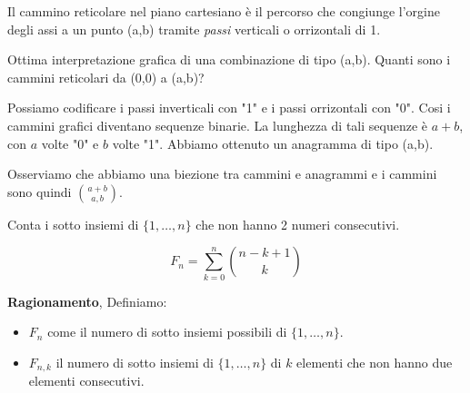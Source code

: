 \begin{center}
\end{center}

Il cammino reticolare nel piano cartesiano è il percorso che congiunge l'orgine degli assi a un punto (a,b) tramite \textit{passi} verticali o orrizontali di 1.

Ottima interpretazione grafica di una combinazione di tipo (a,b).
Quanti sono i cammini reticolari da (0,0) a (a,b)?

Possiamo codificare i passi inverticali con "1" e i passi orrizontali con "0". Cosi i cammini grafici diventano sequenze binarie. La lunghezza di tali sequenze è $a+b$, con $a$ volte "0" e $b$ volte "1". Abbiamo ottenuto un anagramma di tipo (a,b).

Osserviamo che abbiamo una biezione tra cammini e anagrammi e i cammini sono quindi $\binom{a+b}{a,b}$.

Conta i sotto insiemi di $\{1,\dots,n\}$ che non hanno 2 numeri consecutivi.

\[F_n=\sum_{k=0}^n\binom{n-k+1}{k}\]

\textbf{Ragionamento}, Definiamo:

\begin{itemize}
	\item $F_n$ come il numero di sotto insiemi possibili di $\{1,\dots,n\}$.
	\item $F_{n,k}$ il numero di sotto insiemi di $\{1,\dots,n\}$ di $k$ elementi che non hanno due elementi consecutivi.
\end{itemize}

